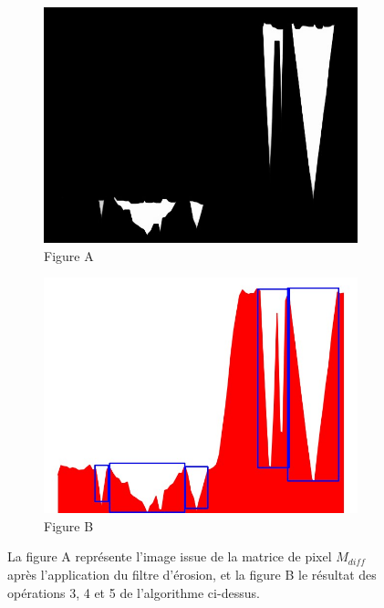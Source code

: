 \documentclass[french]{article}
\theoremstyle{mytheoremstyle}
\theoremstyle{mytheoremstyle}
\theoremstyle{myproblemstyle}
\begin{document}
\begin{figure}[H]
    \centering
    \begin{subfigure}[t]{0.3\textwidth}
            \centering
            \includegraphics[width=1\linewidth]{images/od_erosion.jpg}
            \caption{Figure A}
    \end{subfigure}%
    \begin{subfigure}[t]{0.5\textwidth}
            \centering
            \includegraphics[width=1\linewidth]{images/od_identified.jpg}
            \caption{Figure B}
    \end{subfigure}
    \caption{La figure A représente l'image issue de la matrice de pixel $M_{diff}$ après l'application du filtre d'érosion, et la figure B le résultat des opérations 3, 4 et 5 de l'algorithme ci-dessus.}
\end{figure}
\end{document}
